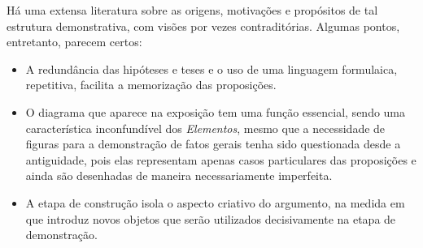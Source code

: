 \documentclass{hipatia}
\begin{document}
Há uma extensa literatura sobre
as origens, motivações e propósitos de 
tal estrutura demonstrativa, com visões
por vezes contraditórias. Algumas pontos,
entretanto, parecem certos:
\begin{itemize}
\item A redundância das hipóteses e teses e o uso
de uma linguagem formulaica, repetitiva,
facilita a memorização das proposições.
\item O diagrama que aparece na exposição tem
uma função essencial, sendo uma característica 
inconfundível dos \emph{Elementos}, 
mesmo que a necessidade
de figuras para a demonstração de fatos 
gerais tenha sido questionada desde a antiguidade,
pois elas representam apenas casos particulares 
das proposições e ainda são desenhadas de maneira
necessariamente imperfeita.
\item A etapa de construção isola o aspecto
criativo do argumento, na medida em que introduz
novos objetos que serão utilizados
decisivamente na etapa de demonstração.
\end{itemize} 

\end{document}
